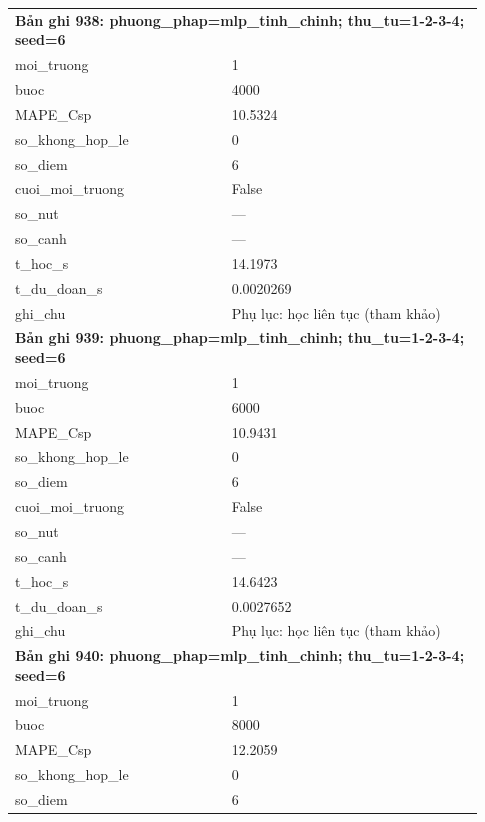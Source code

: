 \begin{longtable}{p{0.43\linewidth}p{0.50\linewidth}}
\midrule
\multicolumn{2}{p{0.95\linewidth}}{\textbf{Bản ghi 938: phuong\_phap=mlp\_tinh\_chinh; thu\_tu=1-2-3-4; seed=6}} \\
moi\_\allowbreak truong & 1 \\
buoc & 4000 \\
MAPE\_\allowbreak Csp & 10.5324 \\
so\_\allowbreak khong\_\allowbreak hop\_\allowbreak le & 0 \\
so\_\allowbreak diem & 6 \\
cuoi\_\allowbreak moi\_\allowbreak truong & False \\
so\_\allowbreak nut & — \\
so\_\allowbreak canh & — \\
t\_\allowbreak hoc\_\allowbreak s & 14.1973 \\
t\_\allowbreak du\_\allowbreak doan\_\allowbreak s & 0.0020269 \\
ghi\_\allowbreak chu & Phụ lục: học liên tục (tham khảo) \\
\midrule
\multicolumn{2}{p{0.95\linewidth}}{\textbf{Bản ghi 939: phuong\_phap=mlp\_tinh\_chinh; thu\_tu=1-2-3-4; seed=6}} \\
moi\_\allowbreak truong & 1 \\
buoc & 6000 \\
MAPE\_\allowbreak Csp & 10.9431 \\
so\_\allowbreak khong\_\allowbreak hop\_\allowbreak le & 0 \\
so\_\allowbreak diem & 6 \\
cuoi\_\allowbreak moi\_\allowbreak truong & False \\
so\_\allowbreak nut & — \\
so\_\allowbreak canh & — \\
t\_\allowbreak hoc\_\allowbreak s & 14.6423 \\
t\_\allowbreak du\_\allowbreak doan\_\allowbreak s & 0.0027652 \\
ghi\_\allowbreak chu & Phụ lục: học liên tục (tham khảo) \\
\midrule
\multicolumn{2}{p{0.95\linewidth}}{\textbf{Bản ghi 940: phuong\_phap=mlp\_tinh\_chinh; thu\_tu=1-2-3-4; seed=6}} \\
moi\_\allowbreak truong & 1 \\
buoc & 8000 \\
MAPE\_\allowbreak Csp & 12.2059 \\
so\_\allowbreak khong\_\allowbreak hop\_\allowbreak le & 0 \\
so\_\allowbreak diem & 6 \\

\end{longtable}
